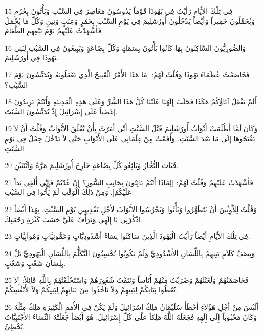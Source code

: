 \par 15 فِي تِلْكَ الأَيَّامِ رَأَيْتُ فِي يَهُوذَا قَوْماً يَدُوسُونَ مَعَاصِرَ فِي السَّبْتِ وَيَأْتُونَ بِحُزَمٍ وَيُحَمِّلُونَ حَمِيراً وَأَيْضاً يَدْخُلُونَ أُورُشَلِيمَ فِي يَوْمِ السَّبْتِ بِخَمْرٍ وَعِنَبٍ وَتِينٍ وَكُلِّ مَا يُحْمَلُ فَأَشْهَدْتُ عَلَيْهِمْ يَوْمَ بَيْعِهِمِ الطَّعَامَ.
\par 16 وَالصُّورِيُّونَ السَّاكِنُونَ بِهَا كَانُوا يَأْتُونَ بِسَمَكٍ وَكُلِّ بِضَاعَةٍ وَيَبِيعُونَ فِي السَّبْتِ لِبَنِي يَهُوذَا فِي أُورُشَلِيمَ.
\par 17 فَخَاصَمْتُ عُظَمَاءَ يَهُوذَا وَقُلْتُ لَهُمْ: [مَا هَذَا الأَمْرُ الْقَبِيحُ الَّذِي تَعْمَلُونَهُ وَتُدَنِّسُونَ يَوْمَ السَّبْتِ؟
\par 18 أَلَمْ يَفْعَلْ آبَاؤُكُمْ هَكَذَا فَجَلَبَ إِلَهُنَا عَلَيْنَا كُلَّ هَذَا الشَّرِّ وَعَلَى هَذِهِ الْمَدِينَةِ وَأَنْتُمْ تَزِيدُونَ غَضَباً عَلَى إِسْرَائِيلَ إِذْ تُدَنِّسُونَ السَّبْتَ].
\par 19 وَكَانَ لَمَّا أَظْلَمَتْ أَبْوَابُ أُورُشَلِيمَ قَبْلَ السَّبْتِ أَنِّي أَمَرْتُ بِأَنْ تُغْلَقَ الأَبْوَابُ وَقُلْتُ أَنْ لاَ يَفْتَحُوهَا إِلَى مَا بَعْدَ السَّبْتِ. وَأَقَمْتُ مِنْ غِلْمَانِي عَلَى الأَبْوَابِ حَتَّى لاَ يَدْخُلَ حِمْلٌ فِي يَوْمِ السَّبْتِ.
\par 20 فَبَاتَ التُّجَّارُ وَبَائِعُو كُلِّ بِضَاعَةٍ خَارِجَ أُورُشَلِيمَ مَرَّةً وَاثْنَتَيْنِ.
\par 21 فَأَشْهَدْتُ عَلَيْهِمْ وَقُلْتُ لَهُمْ: [لِمَاذَا أَنْتُمْ بَائِتُونَ بِجَانِبِ السُّورِ؟ إِنْ عُدْتُمْ فَإِنِّي أُلْقِي يَداً عَلَيْكُمْ]. وَمِنْ ذَلِكَ الْوَقْتِ لَمْ يَأْتُوا فِي السَّبْتِ.
\par 22 وَقُلْتُ لِلاَّوِيِّينَ أَنْ يَتَطَهَّرُوا وَيَأْتُوا وَيَحْرُسُوا الأَبْوَابَ لأَجْلِ تَقْدِيسِ يَوْمِ السَّبْتِ. بِهَذَا أَيْضاً اذْكُرْنِي يَا إِلَهِي وَتَرَأَّفْ عَلَيَّ حَسَبَ كَثْرَةِ رَحْمَتِكَ.
\par 23 فِي تِلْكَ الأَيَّامِ أَيْضاً رَأَيْتُ الْيَهُودَ الَّذِينَ سَاكَنُوا نِسَاءً أَشْدُودِيَّاتٍ وَعَمُّونِيَّاتٍ وَمُوآبِيَّاتٍ.
\par 24 وَنِصْفُ كَلاَمِ بَنِيهِمْ بِاللِّسَانِ الأَشْدُودِيِّ وَلَمْ يَكُونُوا يُحْسِنُونَ التَّكَلُّمَ بِاللِّسَانِ الْيَهُودِيِّ بَلْ بِلِسَانِ شَعْبٍ وَشَعْبٍ.
\par 25 فَخَاصَمْتُهُمْ وَلَعَنْتُهُمْ وَضَرَبْتُ مِنْهُمْ أُنَاساً وَنَتَفْتُ شُعُورَهُمْ وَاسْتَحْلَفْتُهُمْ بِاللَّهِ قَائِلاً: [لاَ تُعْطُوا بَنَاتِكُمْ لِبَنِيهِمْ وَلاَ تَأْخُذُوا مِنْ بَنَاتِهِمْ لِبَنِيكُمْ وَلاَ لأَنْفُسِكُمْ.
\par 26 أَلَيْسَ مِنْ أَجْلِ هَؤُلاَءِ أَخْطَأَ سُلَيْمَانُ مَلِكُ إِسْرَائِيلَ وَلَمْ يَكُنْ فِي الأُمَمِ الْكَثِيرَةِ مَلِكٌ مِثْلُهُ وَكَانَ مَحْبُوباً إِلَى إِلَهِهِ فَجَعَلَهُ اللَّهُ مَلِكاً علَى كُلِّ إِسْرَائِيلَ. هُوَ أَيْضاً جَعَلَتْهُ النِّسَاءُ الأَجْنَبِيَّاتُ يُخْطِئُ.
